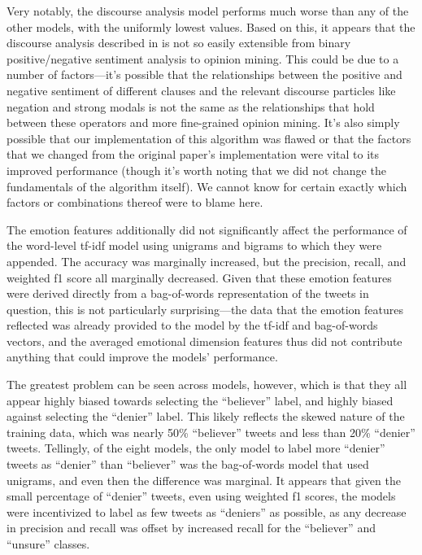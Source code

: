\documentclass[article,oneside,a4paper,12pt]{memoir}
\begin{document}
Very notably, the discourse analysis model performs much worse than any of the other models, with the uniformly lowest values. Based on this, it appears that the discourse analysis described in \textcite{coling2012} is not so easily extensible from binary positive/negative sentiment analysis to opinion mining. This could be due to a number of factors---it's possible that the relationships between the positive and negative sentiment of different clauses and the relevant discourse particles like negation and strong modals is not the same as the relationships that hold between these operators and more fine-grained opinion mining. It's also simply possible that our implementation of this algorithm was flawed or that the factors that we changed from the original paper's implementation were vital to its improved performance (though it's worth noting that we did not change the fundamentals of the algorithm itself). We cannot know for certain exactly which factors or combinations thereof were to blame here.

The emotion features additionally did not significantly affect the performance of the word-level tf-idf model using unigrams and bigrams to which they were appended. The accuracy was marginally increased, but the precision, recall, and weighted f1 score all marginally decreased. Given that these emotion features were derived directly from a bag-of-words representation of the tweets in question, this is not particularly surprising---the data that the emotion features reflected was already provided to the model by the tf-idf and bag-of-words vectors, and the averaged emotional dimension features thus did not contribute anything that could improve the models' performance.

The greatest problem can be seen across models, however, which is that they all appear highly biased towards selecting the ``believer'' label, and highly biased against selecting the ``denier'' label. This likely reflects the skewed nature of the training data, which was nearly 50\% ``believer'' tweets and less than 20\% ``denier'' tweets. Tellingly, of the eight models, the only model to label more ``denier'' tweets as ``denier'' than ``believer'' was the bag-of-words model that used unigrams, and even then the difference was marginal. It appears that given the small percentage of ``denier'' tweets, even using weighted f1 scores, the models were incentivized to label as few tweets as ``deniers'' as possible, as any decrease in precision and recall was offset by increased recall for the ``believer'' and ``unsure'' classes. 
\end{document}
